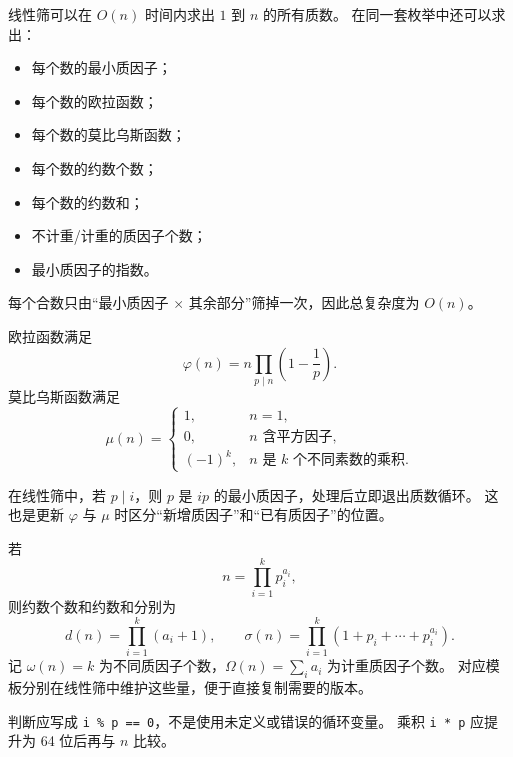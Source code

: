 线性筛可以在 $O(n)$ 时间内求出 $1$ 到 $n$ 的所有质数。
在同一套枚举中还可以求出：
\begin{itemize}
  \item 每个数的最小质因子；
  \item 每个数的欧拉函数；
  \item 每个数的莫比乌斯函数；
  \item 每个数的约数个数；
  \item 每个数的约数和；
  \item 不计重/计重的质因子个数；
  \item 最小质因子的指数。
\end{itemize}
每个合数只由“最小质因子 $\times$ 其余部分”筛掉一次，因此总复杂度为 $O(n)$。

欧拉函数满足
\[
  \varphi(n)=n\prod_{p\mid n}\left(1-\frac1p\right).
\]
莫比乌斯函数满足
\[
  \mu(n)=
  \begin{cases}
    1,&n=1,\\
    0,&n\text{ 含平方因子},\\
    (-1)^k,&n\text{ 是 }k\text{ 个不同素数的乘积}.
  \end{cases}
\]

在线性筛中，若 $p\mid i$，则 $p$ 是 $ip$ 的最小质因子，处理后立即退出质数循环。
这也是更新 $\varphi$ 与 $\mu$ 时区分“新增质因子”和“已有质因子”的位置。

若
\[
  n=\prod_{i=1}^{k}p_i^{a_i},
\]
则约数个数和约数和分别为
\[
  d(n)=\prod_{i=1}^{k}(a_i+1),
  \qquad
  \sigma(n)=\prod_{i=1}^{k}(1+p_i+\cdots+p_i^{a_i}).
\]
记 $\omega(n)=k$ 为不同质因子个数，$\Omega(n)=\sum_i a_i$ 为计重质因子个数。
对应模板分别在线性筛中维护这些量，便于直接复制需要的版本。

\begin{icpcwarning}[常见错误]
  判断应写成 \texttt{i \% p == 0}，不是使用未定义或错误的循环变量。
  乘积 \texttt{i * p} 应提升为 64 位后再与 $n$ 比较。
\end{icpcwarning}

